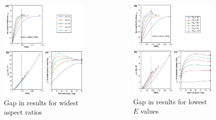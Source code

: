 \begin{frame}
\begin{columns}
\begin{column}{0.45\textwidth}
\begin{figure}[tbp]
\centering
\includegraphics[width=0.7\columnwidth]{aspect-ratio-gap}
\caption{\label{fig:aspect-ratio-gap} Gap in results for widest aspect ratios}
\end{figure}
\end{column}
\begin{column}{0.45\textwidth}
\begin{figure}[tbp]
\centering
\includegraphics[width=0.7\columnwidth]{modulus-gap}
\caption{Gap in results for lowest \(E\) values}
\end{figure}
\end{column}
\end{columns}
\end{frame}

